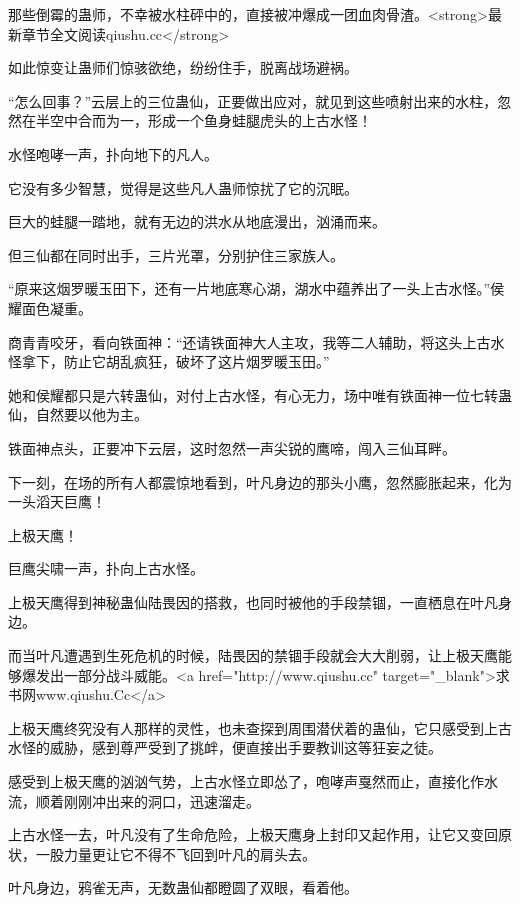 
\begin{this_body}

那些倒霉的蛊师，不幸被水柱砰中的，直接被冲爆成一团血肉骨渣。<strong>最新章节全文阅读qiushu.cc</strong>

如此惊变让蛊师们惊骇欲绝，纷纷住手，脱离战场避祸。

“怎么回事？”云层上的三位蛊仙，正要做出应对，就见到这些喷射出来的水柱，忽然在半空中合而为一，形成一个鱼身蛙腿虎头的上古水怪！

水怪咆哮一声，扑向地下的凡人。

它没有多少智慧，觉得是这些凡人蛊师惊扰了它的沉眠。

巨大的蛙腿一踏地，就有无边的洪水从地底漫出，汹涌而来。

但三仙都在同时出手，三片光罩，分别护住三家族人。

“原来这烟罗暖玉田下，还有一片地底寒心湖，湖水中蕴养出了一头上古水怪。”侯耀面色凝重。

商青青咬牙，看向铁面神：“还请铁面神大人主攻，我等二人辅助，将这头上古水怪拿下，防止它胡乱疯狂，破坏了这片烟罗暖玉田。”

她和侯耀都只是六转蛊仙，对付上古水怪，有心无力，场中唯有铁面神一位七转蛊仙，自然要以他为主。

铁面神点头，正要冲下云层，这时忽然一声尖锐的鹰啼，闯入三仙耳畔。

下一刻，在场的所有人都震惊地看到，叶凡身边的那头小鹰，忽然膨胀起来，化为一头滔天巨鹰！

上极天鹰！

巨鹰尖啸一声，扑向上古水怪。

上极天鹰得到神秘蛊仙陆畏因的搭救，也同时被他的手段禁锢，一直栖息在叶凡身边。

而当叶凡遭遇到生死危机的时候，陆畏因的禁锢手段就会大大削弱，让上极天鹰能够爆发出一部分战斗威能。<a href="http://www.qiushu.cc" target="\_blank">求书网www.qiushu.Cc</a>

上极天鹰终究没有人那样的灵性，也未查探到周围潜伏着的蛊仙，它只感受到上古水怪的威胁，感到尊严受到了挑衅，便直接出手要教训这等狂妄之徒。

感受到上极天鹰的汹汹气势，上古水怪立即怂了，咆哮声戛然而止，直接化作水流，顺着刚刚冲出来的洞口，迅速溜走。

上古水怪一去，叶凡没有了生命危险，上极天鹰身上封印又起作用，让它又变回原状，一股力量更让它不得不飞回到叶凡的肩头去。

叶凡身边，鸦雀无声，无数蛊仙都瞪圆了双眼，看着他。


\end{this_body}

